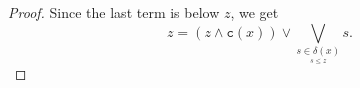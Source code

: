 \documentclass{article}
\newcommand{\comm}[2]{\begin{tcolorbox}[colback=gray!40]\textbf{Comment} (#1) : #2\end{tcolorbox}}
\newcommand{\blue}{\color{blue}}
\begin{document}
\begin{proof}
{Since the last term is below $z$, 
we get 
\[z = (z \wedge \texttt{c}(x)) \vee \bigvee_{\underset{s \le z}{s \in \delta(x)}} s.\]
}
\end{proof}





\end{document}
